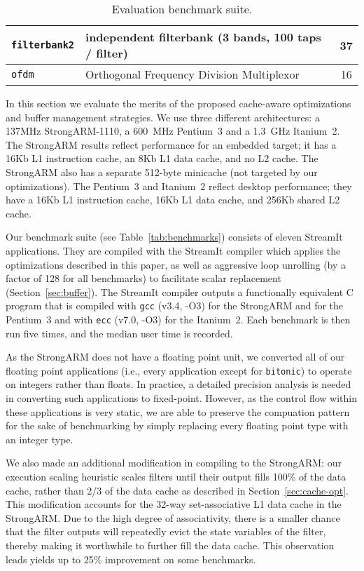 \begin{table}[t]
{\begin{tabular}{|l|l|c|}
\hspace{-2pt}\texttt{filterbank2}\hspace{-3pt}& \hspace{-2pt}independent filterbank (3 bands, 100 taps / filter) &	37 \\ \hline
\hspace{-2pt}\texttt{ofdm	 }& \hspace{-2pt}Orthogonal Frequency Division Multiplexor~\cite{spectrumware}	&	16 \\ \hline
\end{tabular}
}
\caption{Evaluation benchmark suite.}
\end{table}

In this section we evaluate the merits of the proposed cache-aware
optimizations and buffer management strategies.  We use three
different architectures: a 137MHz StrongARM-1110, a 600~MHz Pentium~3
and a 1.3~GHz Itanium~2. The StrongARM results reflect performance for
an embedded target; it has a 16Kb L1 instruction cache, an 8Kb L1 data
cache, and no L2 cache.  The StrongARM also has a separate 512-byte
minicache (not targeted by our optimizations).  The Pentium~3 and
Itanium~2 reflect desktop performance; they have a 16Kb L1 instruction
cache, 16Kb L1 data cache, and 256Kb shared L2 cache.

Our benchmark suite (see Table~\ref{tab:benchmarks}) consists of
eleven StreamIt applications. They are compiled with the StreamIt
compiler which applies the optimizations described in this paper, as
well as aggressive loop unrolling (by a factor of 128 for all
benchmarks) to facilitate scalar replacement
(Section~\ref{sec:buffer}).  The StreamIt compiler outputs a
functionally equivalent C program that is compiled with \texttt{gcc}
(v3.4, -O3) for the StrongARM and for the Pentium~3 and with
\texttt{ecc} (v7.0, -O3) for the Itanium~2.  Each benchmark is then
run five times, and the median user time is recorded.

As the StrongARM does not have a floating point unit, we converted all
of our floating point applications (i.e., every application except for
{\tt bitonic}) to operate on integers rather than floats.  In
practice, a detailed precision analysis is needed in converting such
applications to fixed-point.  However, as the control flow within
these applications is very static, we are able to preserve the
compuation pattern for the sake of benchmarking by simply replacing
every floating point type with an integer type.

We also made an additional modification in compiling to the StrongARM:
our execution scaling heuristic scales filters until their output
fills 100\% of the data cache, rather than 2/3 of the data cache as
described in Section~\ref{sec:cache-opt}.  This modification accounts
for the 32-way set-associative L1 data cache in the StrongARM.  Due to
the high degree of associativity, there is a smaller chance that the
filter outputs will repeatedly evict the state variables of the
filter, thereby making it worthwhile to further fill the data cache.
This observation leads yields up to 25\% improvement on some
benchmarks.

